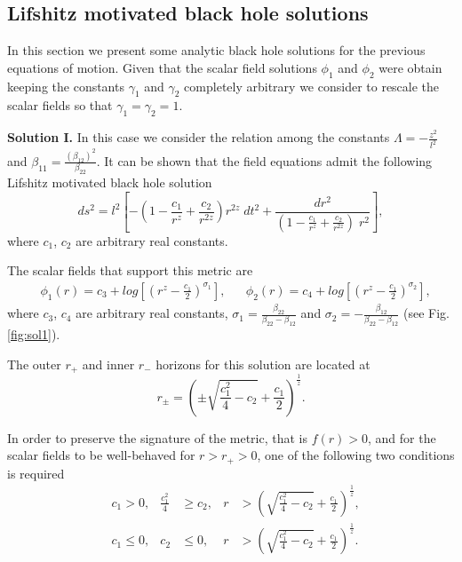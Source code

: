 \documentclass[sn-mathphys,Numbered]{sn-jnl}%
\theoremstyle{thmstyleone}%
\theoremstyle{thmstyletwo}%
\theoremstyle{thmstylethree}%
\begin{document}
\subsection{Lifshitz motivated black hole solutions} \label{seccion de soluciones}
In this section we present some analytic black hole solutions for the previous equations of motion. Given that the scalar field solutions $\phi_1$ and $\phi_2$ were obtain keeping the constants $\gamma_1$ and $\gamma_2$ completely arbitrary we consider to rescale the scalar fields so that $\gamma_1=\gamma_2=1$.

\textbf{Solution I.} In this case we consider the relation among the constants $\Lambda=-\frac{z^2}{l^2}$ and $\beta_{11}= \frac{\left(\beta_{12}\right)^2} {\beta_{22}}$. It can be shown that the field equations admit the following Lifshitz motivated black hole solution
\begin{equation} \label{blackhole I}
    ds^2=l^2\left[-\left(1-\frac{c_1}{r^z}+\frac{c_2}{r^{2z}}\right)r^{2z}\;dt^{2}+\frac{dr^2}{ \left(1-\frac{c_1}{r^z}+\frac{c_2}{r^{2z}}\right) \;r^2} \right],
\end{equation}
where $c_1$, $c_2$ are arbitrary real constants.

The scalar fields that support this metric are
%
\begin{align}
    &\phi_1(r)= c_3+  log\left[ \left( r^z - \frac{c_1}{2} \right)^{\sigma_1}\right], &
    &\phi_2(r)= c_4 + log\left[ \left( r^z - \frac{c_1}{2}\right)^{\sigma_2}\right],
\end{align}
where $c_3$, $c_4$ are arbitrary real constants, $\sigma_1=\frac{\beta_{22}}{\beta_{22} -\beta_{12}}$ and $\sigma_2=-\frac{\beta_{12}}{\beta_{22} -\beta_{12}}$ (see Fig. \ref{fig:sol1}).

The outer $r_+$ and inner $r_-$ horizons for this solution are located at
%
\begin{equation} \label{r+-1}
   r_{\pm}= \left(\pm\sqrt{\frac{c_1^2}{4}-c_2}+\frac{c_1}{2} \right)^{\frac{1}{z}}.
\end{equation}

In order to preserve the signature of the metric, that is $f(r)>0$, and for the scalar fields to be well-behaved for $r> r_+> 0$, one of the following two conditions is required
%
\begin{align} \label{caso1i}
    & c_1 > 0,  & \frac{c_{1}^2}{4} &\geq c_2,  & r &> \left(\sqrt{\frac{c_1^2}{4}-c_2}+\frac{c_1}{2}\right)^{\frac{1}{z}},\\
    &c_1 \leq 0,  &  c_2 &\leq 0,  & r &> \left(\sqrt{\frac{c_1^2}{4}-c_2}+\frac{c_1}{2}\right)^{\frac{1}{z}}. \label{caso1ii}
\end{align}
\end{document}
